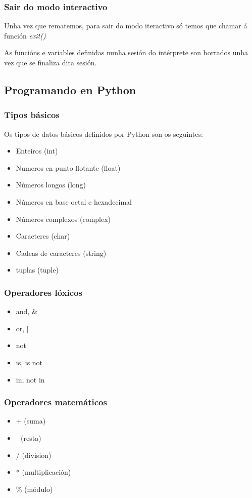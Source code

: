 \begin{frame}
  \frametitle{Sair do modo interactivo}
  Unha vez que rematemos, para sair do modo iteractivo só temos que chamar á
  función \emph{exit()}

  As funcións e variables definidas nunha sesión do intérprete son borrados unha
  vez que se finaliza dita sesión.
\end{frame}

\subsection{Programando en Python}
\label{subsec:Programando}

\begin{frame}
  \frametitle{Tipos básicos}
  Os tipos de datos básicos definidos por Python son os seguintes:
  \begin{itemize}
  \item Enteiros (int)
  \item Numeros en punto flotante (float)
  \item Números longos (long)
  \item Números en base octal e hexadecimal
  \item Números complexos (complex)
  \item Caracteres (char)
  \item Cadeas de caracteres (string)
  \item tuplas (tuple)
  \end{itemize}
\end{frame}

\begin{frame}
  \frametitle{Operadores lóxicos}
  \begin{itemize}
  \item and, \&
  \item or, $|$
  \item not
  \item is, is not
  \item in, not in
  \end{itemize}
\end{frame}

\begin{frame}
  \frametitle{Operadores matemáticos}
  \begin{itemize}
  \item + (suma)
  \item - (resta)
  \item / (division)
  \item * (multiplicación)
  \item \% (módulo)
  \end{itemize}
\end{frame}

